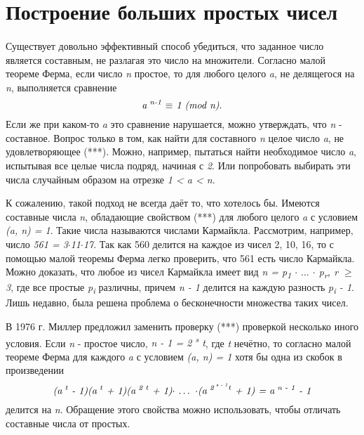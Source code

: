 \section{Построение больших простых чисел}

\paragraph{} Существует довольно эффективный способ убедиться, что заданное число является составным, не разлагая это число на множители. 
Согласно малой теореме Ферма, если число \textit{n} простое, то для любого целого \textit{a}, не делящегося на \textit{n}, выполняется сравнение
\begin{equation}
 \textit{a\textsuperscript{ n-1} {$\equiv$} 1 (mod n)}.
\end{equation}
Если же при каком-то \textit{a} это сравнение нарушается, можно утверждать, что \textit{n} - составное. Вопрос только в том, как найти для составного \textit{n}
целое число \textit{a}, не удовлетворяющее (***). Можно, например, пытаться найти необходимое число \textit{a}, испытывая все целые числа подряд, 
начиная с \textit{2}. Или попробовать выбирать эти числа случайным образом на отрезке \textit{1 < a < n}.

  К сожалению, такой подход не всегда даёт то, что хотелось бы. Имеются составные числа \textit{n}, обладающие свойством (***) для любого целого
\textit{a} с условием \textit{(a, n) = 1}. Такие числа называются числами Кармайкла. Рассмотрим, например, число \textit{561 = 3{$\cdot$}11{$\cdot$}17}. 
Так как 560 делится на каждое из чисел 2, 10, 16, то с помощью малой теоремы Ферма легко проверить, что 561 есть число Кармайкла. 
Можно доказать, что любое из чисел Кармайкла имеет вид \textit{n = p\textsubscript{1} {$\cdot$} {$\dots$} {$\cdot$} p\textsubscript{r}, r {$\geq$} 3}, 
где все простые \textit{p\textsubscript{i}} различны, причем \textit{n - 1} делится на каждую разность \textit{p\textsubscript{i} - 1}. 
Лишь недавно, была решена проблема о бесконечности множества таких чисел.

  В 1976 г. Миллер предложил заменить проверку (***) проверкой несколько иного условия. Если \textit{n} - простое число, 
\textit{n - 1 = 2\textsuperscript{ s} t}, где \textit{t} нечётно, то согласно малой теореме Ферма для каждого \textit{a} с 
условием \textit{(a, n) = 1} хотя бы одна из скобок в произведении
\begin{equation}
 \textit{(a\textsuperscript{ t} - 1)(a\textsuperscript{ t} + 1)(a\textsuperscript{ 2 t} + 1){$\cdot$} {$\dots$} {$\cdot$}(a\textsuperscript{ 2\textsuperscript{ s - 1}t} + 1) = a\textsuperscript{ n - 1} - 1}
\end{equation}
делится на \textit{n}. Обращение этого свойства можно использовать, чтобы отличать составные числа от простых.

